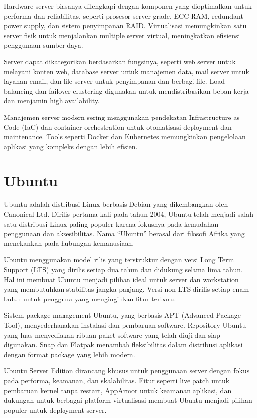 \documentclass[a4paper,12pt]{report}
\begin{document}
Hardware server biasanya dilengkapi dengan komponen yang dioptimalkan untuk performa dan reliabilitas, seperti prosesor server-grade, ECC RAM, redundant power supply, dan sistem penyimpanan RAID. Virtualisasi memungkinkan satu server fisik untuk menjalankan multiple server virtual, meningkatkan efisiensi penggunaan sumber daya.

Server dapat dikategorikan berdasarkan fungsinya, seperti web server untuk melayani konten web, database server untuk manajemen data, mail server untuk layanan email, dan file server untuk penyimpanan dan berbagi file. Load balancing dan failover clustering digunakan untuk mendistribusikan beban kerja dan menjamin high availability.

Manajemen server modern sering menggunakan pendekatan Infrastructure as Code (IaC) dan container orchestration untuk otomatisasi deployment dan maintenance. Tools seperti Docker dan Kubernetes memungkinkan pengelolaan aplikasi yang kompleks dengan lebih efisien.

\section{Ubuntu}
Ubuntu adalah distribusi Linux berbasis Debian yang dikembangkan oleh Canonical Ltd. Dirilis pertama kali pada tahun 2004, Ubuntu telah menjadi salah satu distribusi Linux paling populer karena fokusnya pada kemudahan penggunaan dan aksesibilitas. Nama ``Ubuntu'' berasal dari filosofi Afrika yang menekankan pada hubungan kemanusiaan.

Ubuntu menggunakan model rilis yang terstruktur dengan versi Long Term Support (LTS) yang dirilis setiap dua tahun dan didukung selama lima tahun. Hal ini membuat Ubuntu menjadi pilihan ideal untuk server dan workstation yang membutuhkan stabilitas jangka panjang. Versi non-LTS dirilis setiap enam bulan untuk pengguna yang menginginkan fitur terbaru.

Sistem package management Ubuntu, yang berbasis APT (Advanced Package Tool), menyederhanakan instalasi dan pembaruan software. Repository Ubuntu yang luas menyediakan ribuan paket software yang telah diuji dan siap digunakan. Snap dan Flatpak menambah fleksibilitas dalam distribusi aplikasi dengan format package yang lebih modern.

Ubuntu Server Edition dirancang khusus untuk penggunaan server dengan fokus pada performa, keamanan, dan skalabilitas. Fitur seperti live patch untuk pembaruan kernel tanpa restart, AppArmor untuk keamanan aplikasi, dan dukungan untuk berbagai platform virtualisasi membuat Ubuntu menjadi pilihan populer untuk deployment server.
\end{document}
